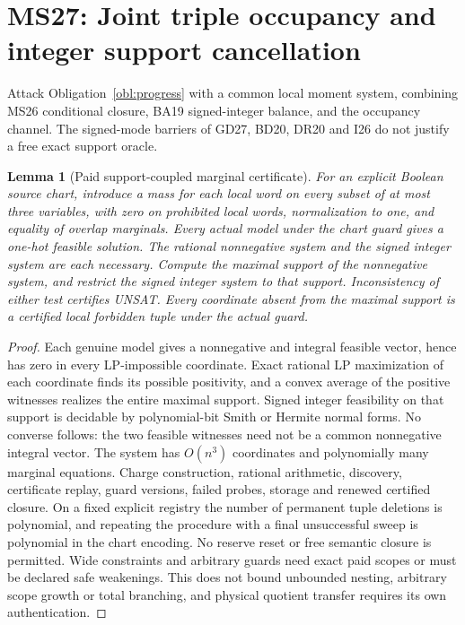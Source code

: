 \documentclass[11pt]{article}
\newtheorem{lemma}[theorem]{Lemma}
\begin{document}
\section{MS27: Joint triple occupancy and integer support cancellation}\label{sec:ms27}
Attack Obligation~\ref{obl:progress} with a common local moment system, combining MS26 conditional closure, BA19 signed-integer balance, and the occupancy channel. The signed-mode barriers of GD27, BD20, DR20 and I26 do not justify a free exact support oracle.
\begin{lemma}[Paid support-coupled marginal certificate]\label{lem:ms27-support}
For an explicit Boolean source chart, introduce a mass for each local word on every subset of at most three variables, with zero on prohibited local words, normalization to one, and equality of overlap marginals. Every actual model under the chart guard gives a one-hot feasible solution. The rational nonnegative system and the signed integer system are each necessary. Compute the maximal support of the nonnegative system, and restrict the signed integer system to that support. Inconsistency of either test certifies UNSAT. Every coordinate absent from the maximal support is a certified local forbidden tuple under the actual guard.
\end{lemma}
\begin{proof}
Each genuine model gives a nonnegative and integral feasible vector, hence has zero in every LP-impossible coordinate. Exact rational LP maximization of each coordinate finds its possible positivity, and a convex average of the positive witnesses realizes the entire maximal support. Signed integer feasibility on that support is decidable by polynomial-bit Smith or Hermite normal forms. No converse follows: the two feasible witnesses need not be a common nonnegative integral vector. The system has $O(n^3)$ coordinates and polynomially many marginal equations. Charge construction, rational arithmetic, discovery, certificate replay, guard versions, failed probes, storage and renewed certified closure. On a fixed explicit registry the number of permanent tuple deletions is polynomial, and repeating the procedure with a final unsuccessful sweep is polynomial in the chart encoding. No reserve reset or free semantic closure is permitted. Wide constraints and arbitrary guards need exact paid scopes or must be declared safe weakenings. This does not bound unbounded nesting, arbitrary scope growth or total branching, and physical quotient transfer requires its own authentication.
\end{proof}
\end{document}
